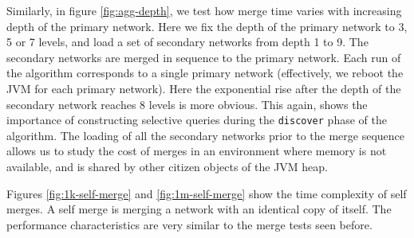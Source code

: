 Similarly, in figure \ref{fig:agg-depth}, we test how merge time varies with increasing depth of the primary network. Here we fix the depth of the primary network to 3, 5 or 7 levels, and load a set of secondary networks from depth 1 to 9. The secondary networks are merged in sequence to the primary network. Each run of the algorithm corresponds to a single primary network (effectively, we reboot the JVM for each primary network). Here the exponential rise after the depth of the secondary network reaches 8 levels is more obvious. This again, shows the importance of constructing selective queries during the \texttt{discover} phase of the algorithm. The loading of all the secondary networks prior to the merge sequence allows us to study the cost of merges in an environment where  memory is not available, and is shared by other citizen objects of the JVM heap. 

Figures \ref{fig:1k-self-merge} and \ref{fig:1m-self-merge} show the time complexity of self merges. A self merge is merging a network with an identical copy of itself. The performance characteristics are very similar to the merge tests seen before.

